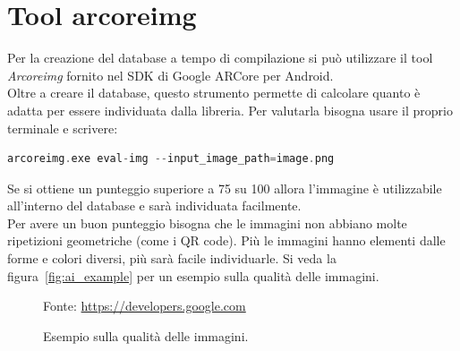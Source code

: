 \documentclass[crop=false, class=book]{standalone}
\begin{document}
	\section{Tool arcoreimg}	
	\label{sec:arcoreimg}
	Per la creazione del database a tempo di compilazione si può utilizzare il tool \textit{Arcoreimg} fornito nel SDK di Google ARCore per Android. \\
	\noindent
	Oltre a creare il database, questo strumento permette di calcolare quanto è adatta per essere individuata dalla libreria.
	Per valutarla bisogna usare il proprio terminale e scrivere:
	\begin{center}
		\begin{minipage}{0.95\textwidth}
			\begin{lstlisting}[caption={Valutazione delle immagini}, label={lst:ai_arcoreimg}, language=Kotlin, basicstyle=\ttfamily\scriptsize]
			arcoreimg.exe eval-img --input_image_path=image.png
			\end{lstlisting}
		\end{minipage}
	\end{center}
	\noindent
	Se si ottiene un punteggio superiore a 75 su 100 allora l'immagine è utilizzabile all'interno del database e sarà individuata facilmente.\\
	\noindent
	Per avere un buon punteggio bisogna che le immagini non abbiano molte ripetizioni geometriche (come i QR code). Più le immagini hanno elementi dalle forme e colori diversi, più sarà facile individuarle. Si veda la figura~\vref{fig:ai_example} per un esempio sulla qualità delle immagini.
	
	\begin{center}
		\begin{figure}[htp]
			\centering
			{Fonte: \url{https://developers.google.com}}
			\caption{Esempio sulla qualità delle immagini.}
			\label{fig:ai_example}
		\end{figure}
	\end{center}
	
\end{document}
